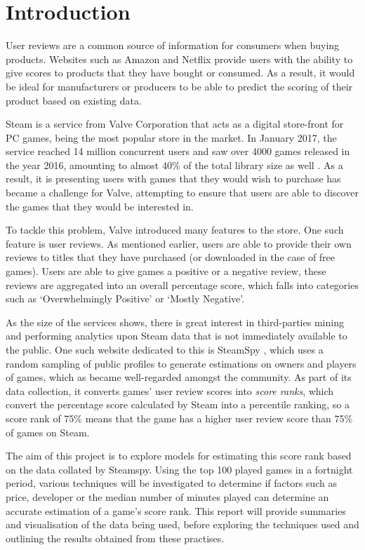 \documentclass[introduction.tex]{subfiles}
\begin{document}
\section{Introduction} %
\label{sec:introduction}

User reviews are a common source of information for consumers when buying
products. Websites such as Amazon and Netflix provide users with the ability to
give scores to products that they have bought or consumed. As a result, it would
be ideal for manufacturers or producers to be able to predict the scoring of
their product based on existing data.

Steam is a service from Valve Corporation that acts as a digital store-front for
PC games, being the most popular store in the market. In January 2017, the
service reached 14 million concurrent users \cite{steam_concurrent} and saw over
4000 games released in the year 2016, amounting to almost 40\% of the total
library size as well \cite{steam_games_2016}. As a result, it is presenting
users with games that they would wish to purchase has became a challenge for
Valve, attempting to ensure that users are able to discover the games that they
would be interested in.

To tackle this problem, Valve introduced many features to the store. One such
feature is user reviews. As mentioned earlier, users are able to provide their
own reviews to titles that they have purchased (or downloaded in the case of
free games). Users are able to give games a positive or a negative review, these
reviews are aggregated into an overall percentage score, which falls into
categories such as `Overwhelmingly Positive' or `Mostly Negative'.

As the size of the services shows, there is great interest in third-parties
mining and performing analytics upon Steam data that is not immediately
available to the public. One such website dedicated to this is SteamSpy
\cite{steamspy_home}, which uses a random sampling of public profiles to
generate estimations on owners and players of games, which as became 
well-regarded amongst the community. As part of its data collection, it converts
games' user review scores into \emph{score ranks}, which convert the percentage
score calculated by Steam into a percentile ranking, so a score rank of 75\%
means that the game has a higher user review score than 75\% of games on Steam.

The aim of this project is to explore models for estimating this score rank
based on the data collated by Steamspy. Using the top 100 played games in a
fortnight period, various techniques will be investigated to determine if
factors such as price, developer or the median number of minutes played can
determine an accurate estimation of a game's score rank. This report will
provide summaries and visualisation of the data being used, before exploring the
techniques used and outlining the results obtained from these practises.
\end{document}
